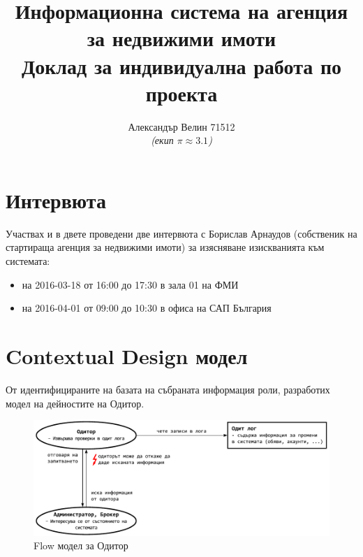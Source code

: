 \documentclass[a4paper]{article}
\begin{document}
\title{Информационна система на агенция за недвижими имоти\\Доклад за индивидуална работа по проекта}
\author{Александър Велин 71512 \\\emph{(екип $\pi \approx 3.1$)}}

\maketitle

\clearpage



\section*{Интервюта}

Участвах и в двете проведени две интервюта с Борислав Арнаудов (собственик на стартираща агенция за недвижими имоти) за изясняване изискванията към системата:
\begin{itemize}
\item на 2016-03-18 от 16:00 до 17:30 в зала 01 на ФМИ
\item на 2016-04-01 от 09:00 до 10:30 в офиса на САП България
\end{itemize}

\section*{Contextual Design модел}

От идентифицираните на базата на събраната информация роли, разработих модел на дейностите на Одитор.

\begin{figure}[h]
\centering
\label{auditor}
\includegraphics[scale=0.85]{flow-auditor-small}
\caption{Flow модел за Одитор}
\end{figure}

\end{document}
